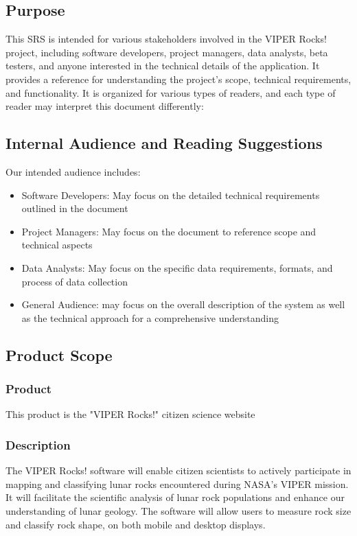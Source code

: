 \documentclass{article}
\begin{document}
\subsection{Purpose}
This SRS is intended for various stakeholders involved in the VIPER Rocks! project, including software developers, project managers, data analysts, beta testers, and anyone interested in the technical details of the application. It provides a reference for understanding the project's scope, technical requirements, and functionality. It is organized for various types of readers, and each type of reader may interpret this document differently:

\subsection{Internal Audience and Reading Suggestions}
Our intended audience includes: 
\begin{itemize}
	\item Software Developers: May focus on the detailed technical requirements outlined in the document
	\item Project Managers: May focus on the document to reference scope and technical aspects
	\item Data Analysts: May focus on the specific data requirements, formats, and process of data collection
	\item General Audience: may focus on the overall description of the system as well as the technical approach for a comprehensive understanding
\end{itemize}

\subsection{Product Scope}

\subsubsection{Product}
This product is the "VIPER Rocks!" citizen science website

\subsubsection{Description}
The VIPER Rocks! software will enable citizen scientists to actively participate in mapping and classifying lunar rocks encountered during NASA's VIPER mission. It will facilitate the scientific analysis of lunar rock populations and enhance our understanding of lunar geology. The software will allow users to measure rock size and classify rock shape, on both mobile and desktop displays.
\end{document}

